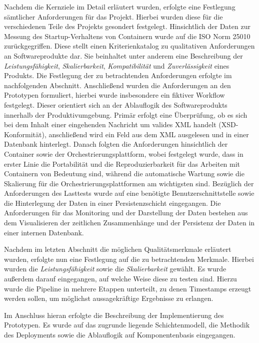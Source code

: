Nachdem die Kernziele im Detail erläutert wurden, erfolgte eine Festlegung sämtlicher Anforderungen für das Projekt. Hierbei wurden diese für die verschiedenen Teile des Projekts gesondert festgelegt. Hinsichtlich der Daten zur Messung des Startup-Verhaltens von Containern wurde auf die ISO Norm 25010 zurückgegriffen. Diese stellt einen Kriterienkatalog zu qualitativen Anforderungen an Softwareprodukte dar. Sie beinhaltet unter anderem eine Beschreibung der \emph{Leistungsfähigkeit}, \emph{Skalierbarkeit}, \emph{Kompatibilität} und \emph{Zuverlässigkeit} eines Produkts. Die Festlegung der zu betrachtenden Anforderungen erfolgte im nachfolgenden Abschnitt. Anschließend wurden die Anforderungen an den Prototypen formuliert, hierbei wurde insbesondere ein fiktiver Workflow festgelegt. Dieser orientiert sich an der Ablauflogik des Softwareprodukts innerhalb der Produktivumgebung. Primär erfolgt eine Überprüfung, ob es sich bei dem Inhalt einer eingehenden Nachricht um valides XML handelt (XSD-Konformität), anschließend wird ein Feld aus dem XML ausgelesen und in einer Datenbank hinterlegt. Danach folgten die Anforderungen hinsichtlich der Container sowie der Orchestrierungsplattform, wobei festgelegt wurde, dass in erster Linie die Portabilität und die Reproduzierbarkeit für das Arbeiten mit Containern von Bedeutung sind, während die automatische Wartung sowie die Skalierung für die Orchestrierungsplattformen am wichtigsten sind. Bezüglich der Anforderungen des Lasttests wurde auf eine benötigte Benutzerschnittstelle sowie die Hinterlegung der Daten in einer Persistenzschicht eingegangen. Die Anforderungen für das Monitoring und der Darstellung der Daten bestehen aus dem Visualisieren der zeitlichen Zusammenhänge und der Persistenz der Daten in einer internen Datenbank.

Nachdem im letzten Abschnitt die möglichen Qualitätsmerkmale erläutert wurden, erfolgte nun eine Festlegung auf die zu betrachtenden Merkmale. Hierbei wurden die \emph{Leistungsfähigkeit} sowie die \emph{Skalierbarkeit} gewählt. Es wurde außerdem darauf eingegangen, auf welche Weise diese zu testen sind. Hierzu wurde die Pipeline in mehrere Etappen unterteilt, zu denen Timestamps erzeugt werden sollen, um möglichst aussagekräftige Ergebnisse zu erlangen. 

Im Anschluss hieran erfolgte die Beschreibung der Implementierung des Prototypen. Es wurde auf das zugrunde liegende Schichtenmodell, die Methodik des Deployments sowie die Ablauflogik auf Komponentenbasis eingegangen. 

